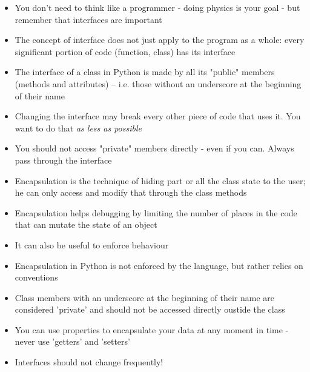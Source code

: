   \begin{itemize}
    \item You don't need to think like a programmer - doing physics is your goal - but
          remember that \alert{interfaces are important}
    \item The concept of interface does not just apply to the program as a whole:
          every significant portion of code (function, class) has its interface
    \item The interface of a class in Python is made by all its "public" members (methods and attributes)
          -- i.e. those without an underscore at the beginning of their name
    \item Changing the interface may break every other piece of code that uses it.
          You want to do that \emph{as less as possible}
    \item You should not access "private" members directly - even if you can. Always
          pass through the interface
    
  \end{itemize}

\hfill
\vfill

\begin{tcolorbox}[width=\textwidth,colback={white},title={Short summary },colbacktitle=cyan,coltitle=black]
  \begin{itemize}
    \small
    \item Encapsulation is the technique of hiding part or all the class state to the user; 
          he can only access and modify that through the class methods
    \medskip
    \item Encapsulation helps debugging by limiting the number of places in the code
          that can mutate the state of an object
    \medskip
    \item It can also be useful to enforce behaviour  
    \medskip
    \item Encapsulation in Python is not enforced by the language, but rather relies on conventions
    \medskip
    \item Class members with an underscore at the beginning of their name are
          considered 'private' and should not be accessed directly oustide the class
    \smallskip
    \item You can use properties to encapsulate your data at any moment in time - never use 'getters' and 'setters'
    \medskip
    \item Interfaces should not change frequently!
  \end{itemize}

\end{tcolorbox}

